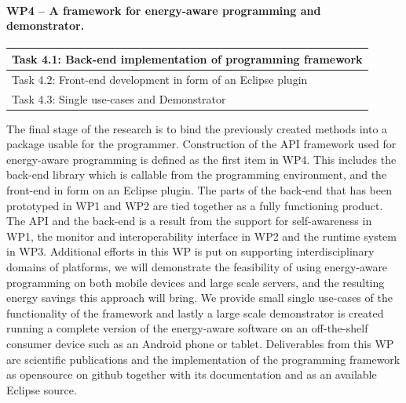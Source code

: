 \documentclass{article}
\begin{document}
\paragraph{WP4 -- A framework for energy-aware programming and demonstrator.}
\begin{table}
\vspace{-0.5cm}
\small
\begin{tabular}{ | l |}
\hline
Task 4.1: Back-end implementation of programming framework\\ \hline
Task 4.2: Front-end development in form of an Eclipse plugin \\ \hline
Task 4.3: Single use-cases and Demonstrator\\ \hline
\end{tabular}
\vspace{-0.3cm}
\end{table}
The final stage of the research is to bind the previously created methods into a package usable for the programmer.
Construction of the API framework used for energy-aware programming is defined as the first item in WP4.
This includes the back-end library which is callable from the programming environment, and the front-end in form on an Eclipse plugin.
The parts of the back-end that has been prototyped in WP1 and WP2 are tied together as a fully functioning product.
The API and the back-end is a result from the support for self-awareness in WP1, the monitor and interoperability interface in WP2 and the runtime system in WP3.
Additional efforts in this WP is put on supporting interdisciplinary domains of platforms, we will demonstrate the feasibility of using energy-aware programming on both mobile devices and large scale servers,
and the resulting energy savings this approach will bring.
We provide small single use-cases of the functionality of the framework and lastly a large scale demonstrator is created running a complete version of the energy-aware software on an off-the-shelf consumer device such as an Android phone or tablet.
Deliverables from this WP are scientific publications and the implementation of the programming framework as opensource on github together with its documentation and as an available Eclipse source.
\end{document}
